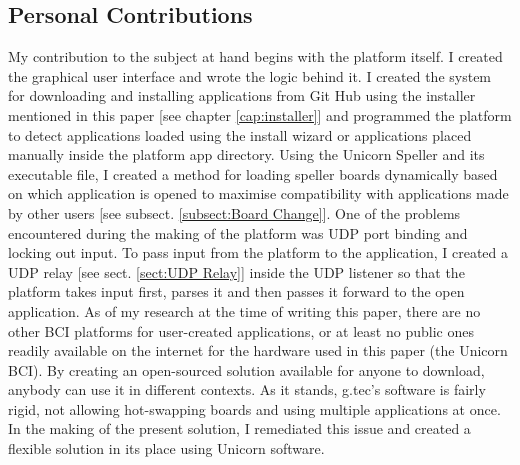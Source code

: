 \subsection{Personal Contributions}
My contribution to the subject at hand begins with the platform itself. I created the graphical user interface and wrote the logic behind it. I created the system for downloading and installing applications from Git Hub using the installer mentioned in this paper [see chapter \ref{cap:installer}] and programmed the platform to detect applications loaded using the install wizard or applications placed manually inside the platform app directory.
\vspace{\baselineskip}\newline
Using the Unicorn Speller and its executable file, I created a method for loading speller boards dynamically based on which application is opened to maximise compatibility with applications made by other users [see subsect. \ref{subsect:Board Change}].
\vspace{\baselineskip}\newline
One of the problems encountered during the making of the platform was UDP port binding and locking out input. To pass input from the platform to the application, I created a UDP relay [see sect. \ref{sect:UDP Relay}] inside the UDP listener so that the platform takes input first, parses it and then passes it forward to the open application.
\vspace{\baselineskip}\newline
As of my research at the time of writing this paper, there are no other BCI platforms for user-created applications, or at least no public ones readily available on the internet for the hardware used in this paper (the Unicorn BCI). By creating an open-sourced solution available for anyone to download, anybody can use it in different contexts. As it stands, g.tec's software is fairly rigid, not allowing hot-swapping boards and using multiple applications at once. In the making of the present solution, I remediated this issue and created a flexible solution in its place using Unicorn software.

